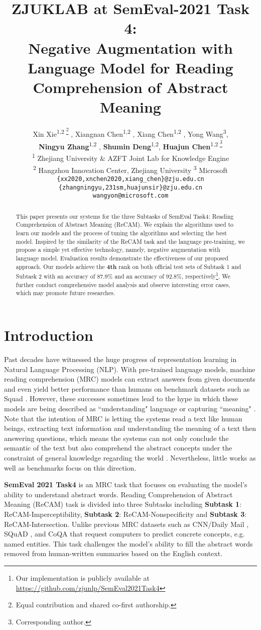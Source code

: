 \documentclass[11pt,a4paper]{article}
\title{ZJUKLAB at SemEval-2021 Task 4:\\ Negative Augmentation with Language Model for Reading Comprehension of Abstract Meaning}
\author{
Xin Xie\textsuperscript{\rm 1,2 \thanks{ Equal contribution and shared co-first authorship.} },  Xiangnan Chen\textsuperscript{\rm 1,2 \footnotemark[1]} , Xiang Chen\textsuperscript{\rm 1,2 \footnotemark[1]} , 
Yong Wang\textsuperscript{\rm 3}, \\ \textbf{Ningyu Zhang}\textsuperscript{\rm 1,2 \dag}, \textbf{Shumin Deng}\textsuperscript{\rm 1,2}, \textbf{Huajun Chen}\textsuperscript{\rm 1,2 \footnote{Corresponding author.}} \\
	\textsuperscript{\rm 1} Zhejiang University \& AZFT Joint Lab for Knowledge Engine \\
	\textsuperscript{\rm 2} Hangzhou Innovation Center, Zhejiang University
	\textsuperscript{\rm 3} Microsoft \\
	\texttt{\{xx2020,xnchen2020,xiang\_chen\}@zju.edu.cn} \\
	\texttt{\{zhangningyu,231sm,huajunsir\}@zju.edu.cn} \\
	\texttt{wangyon@microsoft.com}
}
\date{}
\begin{document}
\maketitle



\begin{abstract}
This paper presents our systems for the three Subtasks of SemEval Task4: Reading Comprehension of Abstract Meaning (ReCAM). We explain the algorithms used to learn our models and the process of tuning the algorithms and selecting the best model. Inspired by the similarity of the ReCAM task and the language pre-training, we propose a simple yet effective technology, namely, negative augmentation with language model. Evaluation results demonstrate the effectiveness of our proposed approach. Our models achieve the \textbf{4th} rank on both official test sets of Subtask 1 and Subtask 2 with an accuracy of 87.9\% and an accuracy of 92.8\%, respectively\footnote{Our implementation is publicly available at \url{https://github.com/zjunlp/SemEval2021Task4}}. We further conduct comprehensive model analysis and observe interesting error cases, which may promote future researches.
\end{abstract}

\section{Introduction}
Past decades have witnessed the huge progress of representation learning in Natural Language Processing (NLP). 
With pre-trained language models, machine reading comprehension (MRC) models can extract answers from given documents and even yield better performance than humans on benchmark datasets such as Squad  \cite{rajpurkar-etal-2016-squad}. 
However, these successes sometimes lead to the hype in which these models are being described as ``understanding" language or capturing ``meaning" \cite{bender-koller-2020-climbing}. 
Note that the intention of MRC is letting the systems read a text like human beings, extracting text information and understanding the meaning of a text then answering questions, which means the systems can not only conclude the semantic of the text but also comprehend the abstract concepts under the constraint of general knowledge regarding the world \cite{DBLP:journals/corr/WangJ16a}. Nevertheless, little works as well as benchmarks focus on this direction. 

\textbf{SemEval 2021 Task4} \cite{zheng-2021-semeval-task4} is an MRC  task that focuses on evaluating the model's ability to understand abstract words.
Reading Comprehension of Abstract Meaning (ReCAM) task is divided into three Subtasks including \textbf{Subtask 1}: ReCAM-Imperceptibility, \textbf{Subtask 2}: ReCAM-Nonspecificity and \textbf{Subtask 3}: ReCAM-Intersection.
Unlike previous MRC datasets such as CNN/Daily Mail \cite{hermann_teaching_2015}, SQuAD \cite{squad}, and CoQA \cite{coqa} that request computers to predict concrete concepts, e.g. named entities. This task challenges the model's ability to fill the abstract words removed from human-written summaries based on the English context.
\end{document}
